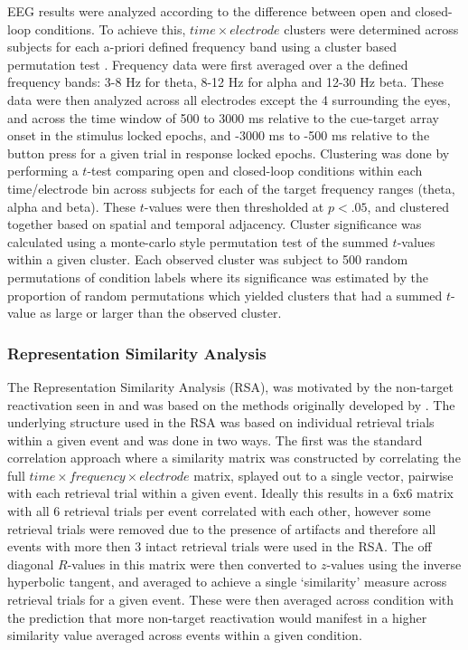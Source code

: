 \documentclass[11pt, titlepage, twoside]{article}
\begin{document}
EEG results were analyzed according to the difference between open and closed-loop conditions.  To achieve this, $time \times electrode$ clusters were determined across subjects for each a-priori defined frequency band using a cluster based permutation test \cite{MarisOostenveld07}.  Frequency data were first averaged over a the defined frequency bands: 3-8 Hz for theta, 8-12 Hz for alpha and 12-30 Hz beta.  These data were then analyzed across all electrodes except the 4 surrounding the eyes, and across the time window of 500 to 3000 ms relative to the cue-target array onset in the stimulus locked epochs, and -3000 ms to -500 ms relative to the button press for a given trial in response locked epochs.  Clustering was done by performing a $t$-test comparing open and closed-loop conditions within each time/electrode bin across subjects for each of the target frequency ranges (theta, alpha and beta).  These $t$-values were then thresholded at $p<.05$, and clustered together based on spatial and temporal adjacency.   Cluster significance was calculated using a monte-carlo style permutation test of the summed $t$-values within a given cluster.  Each observed cluster was subject to 500 random permutations of condition labels where its significance was estimated by the proportion of random permutations which yielded clusters that had a summed $t$-value as large or larger than the observed cluster.

\subsubsection{Representation Similarity Analysis}
\label{sec:deevRSA}
The Representation Similarity Analysis (RSA), was motivated by the non-target reactivation seen in \textcite{HornerBisbyBushEtAl15} and was based on the methods originally developed by \textcite{KriegeskorteMurBandettini08}.  The underlying structure used in the RSA was based on individual retrieval trials within a given event and was done in two ways.  The first was the standard correlation approach where a similarity matrix was constructed by correlating the full $time \times frequency \times electrode$ matrix, splayed out to a single vector, pairwise with each retrieval trial within a given event.  Ideally this results in a 6x6 matrix with all 6 retrieval trials per event correlated with each other, however some retrieval trials were removed due to the presence of artifacts and therefore all events with more then 3 intact retrieval trials were used in the RSA.  The off diagonal $R$-values in this matrix were then converted to $z$-values using the inverse hyperbolic tangent, and averaged to achieve a single `similarity' measure across retrieval trials for a given event.  These were then averaged across condition with the prediction that more non-target reactivation would manifest in a higher similarity value averaged across events within a given condition.
\end{document}
